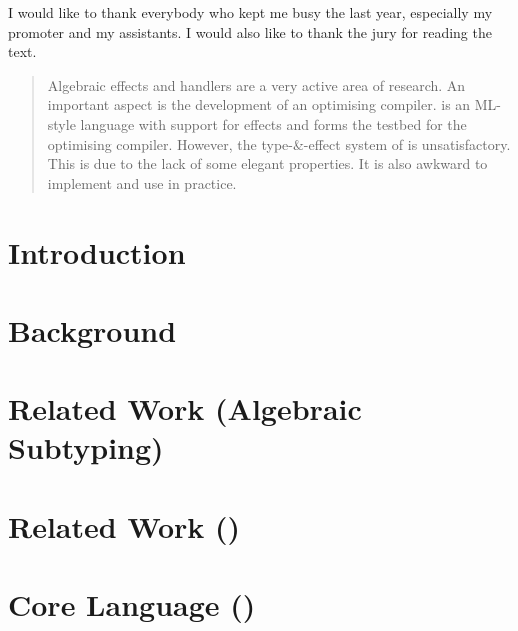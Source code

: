 \documentclass[master=cws,masteroption=ai]{kulemt}
\let\section\chapter
\begin{document}
\begin{preface}
  I would like to thank everybody who kept me busy the last year,
  especially my promoter and my assistants. I would also like to thank the
  jury for reading the text.
\end{preface}

\tableofcontents*

\begin{abstract}
  Algebraic effects and handlers are a very active area of research. An important aspect is the development of an optimising compiler. \eff is an ML-style language with support for effects and forms the testbed for the optimising compiler. However, the type-\&-effect system of \eff is unsatisfactory. This is due to the lack of some elegant properties. It is also awkward to implement and use in practice.
\end{abstract}

\listoffigures
\listoftables

\mainmatter

\section{Introduction}


\section{Background}


\section{Related Work (Algebraic Subtyping)}


\section{Related Work (\eff)}




\section{Core Language (\core)}






\end{document}
